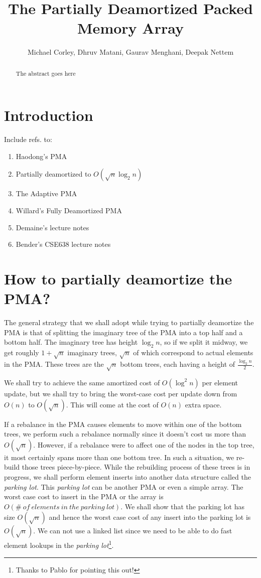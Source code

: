\documentclass{article}
\title{The Partially Deamortized Packed Memory Array}
\author{Michael Corley, Dhruv Matani, Gaurav Menghani, Deepak Nettem}
\begin{document}
\maketitle

\begin{abstract}
  The abstract goes here
\end{abstract}

\clearpage

\section{Introduction}
Include refs. to:
\begin{enumerate}
\item Haodong's PMA
\item Partially deamortized to $O(\sqrt{n}\log_2{n})$
\item The Adaptive PMA
\item Willard's Fully Deamortized PMA
\item Demaine's lecture notes
\item Bender's CSE638 lecture notes
\end{enumerate}

\section{How to partially deamortize the PMA?}

The general strategy that we shall adopt while trying to partially
deamortize the PMA is that of splitting the imaginary tree of the PMA
into a top half and a bottom half. The imaginary tree has height
$\log_2{n}$, so if we split it midway, we get roughly $1 +
\sqrt{n}$ imaginary trees, $\sqrt{n}$ of which correspond to actual
elements in the PMA. These trees are the $\sqrt{n}$ bottom trees, each
having a height of $\frac{\log_2{n}}{2}$.

We shall try to achieve the same amortized cost of $O(\log^2{n})$ per
element update, but we shall try to bring the worst-case cost per
update down from $O(n)$ to $O(\sqrt{n})$. This will come at the cost
of $O(n)$ extra space.

If a rebalance in the PMA causes elements to move within one of the
bottom trees, we perform such a rebalance normally since it doesn't
cost us more than $O(\sqrt{n})$. However, if a rebalance were to
affect one of the nodes in the top tree, it most certainly spans more
than one bottom tree. In such a situation, we re-build those trees
piece-by-piece. While the rebuilding process of these trees is in
progress, we shall perform element inserts into another data structure
called the \textit{parking lot}. This \textit{parking lot} can be
another PMA or even a simple array. The worst case cost to insert in
the PMA or the array is
$O(\#\ of\ elements\ in\ the\ parking\ lot)$. We shall show that the
parking lot has size $O(\sqrt{n})$ and hence the worst case cost of
any insert into the parking lot is $O(\sqrt{n})$. We can not use a
linked list since we need to be able to do fast element lookups in the
\textit{parking lot}\footnote{Thanks to Pablo for pointing this out!}.
\end{document}
